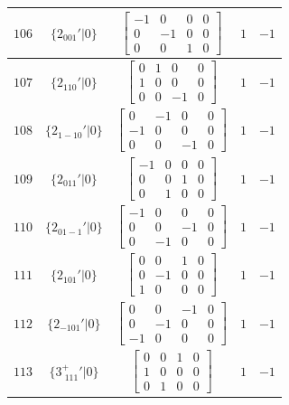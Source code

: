 \documentclass[fleqn,8pt]{jsarticle}
\begin{document}
\begin{longtable}{ccccc}
$ 106 $ & $ \{2{}_{001}{}'|0\} $ & $ \begin{bmatrix} -1 & 0 & 0 & 0 \\ 0 & -1 & 0 & 0 \\ 0 & 0 & 1 & 0 \end{bmatrix} $ & $ 1 $ & $ -1 $ \\ \hline
$ 107 $ & $ \{2{}_{110}{}'|0\} $ & $ \begin{bmatrix} 0 & 1 & 0 & 0 \\ 1 & 0 & 0 & 0 \\ 0 & 0 & -1 & 0 \end{bmatrix} $ & $ 1 $ & $ -1 $ \\ \hline
$ 108 $ & $ \{2{}_{1-10}{}'|0\} $ & $ \begin{bmatrix} 0 & -1 & 0 & 0 \\ -1 & 0 & 0 & 0 \\ 0 & 0 & -1 & 0 \end{bmatrix} $ & $ 1 $ & $ -1 $ \\ \hline
$ 109 $ & $ \{2{}_{011}{}'|0\} $ & $ \begin{bmatrix} -1 & 0 & 0 & 0 \\ 0 & 0 & 1 & 0 \\ 0 & 1 & 0 & 0 \end{bmatrix} $ & $ 1 $ & $ -1 $ \\ \hline
$ 110 $ & $ \{2{}_{01-1}{}'|0\} $ & $ \begin{bmatrix} -1 & 0 & 0 & 0 \\ 0 & 0 & -1 & 0 \\ 0 & -1 & 0 & 0 \end{bmatrix} $ & $ 1 $ & $ -1 $ \\ \hline
$ 111 $ & $ \{2{}_{101}{}'|0\} $ & $ \begin{bmatrix} 0 & 0 & 1 & 0 \\ 0 & -1 & 0 & 0 \\ 1 & 0 & 0 & 0 \end{bmatrix} $ & $ 1 $ & $ -1 $ \\ \hline
$ 112 $ & $ \{2{}_{-101}{}'|0\} $ & $ \begin{bmatrix} 0 & 0 & -1 & 0 \\ 0 & -1 & 0 & 0 \\ -1 & 0 & 0 & 0 \end{bmatrix} $ & $ 1 $ & $ -1 $ \\ \hline
$ 113 $ & $ \{3^{+}_{\,\,111}{}'|0\} $ & $ \begin{bmatrix} 0 & 0 & 1 & 0 \\ 1 & 0 & 0 & 0 \\ 0 & 1 & 0 & 0 \end{bmatrix} $ & $ 1 $ & $ -1 $ \\ \hline

\end{longtable}
\end{document}
